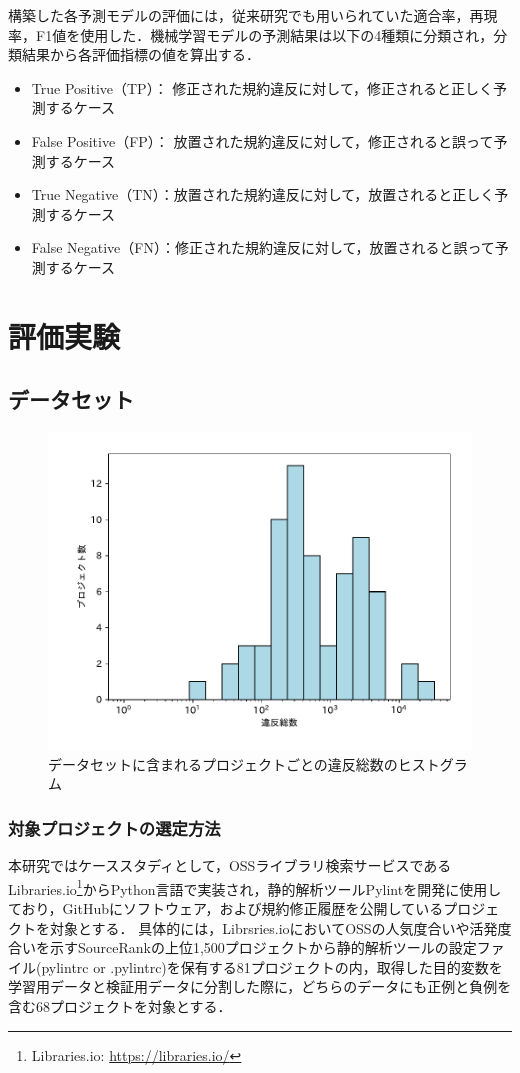\documentclass[submit,noauthor,dvipdfmx]{ipsj}
\begin{document}
構築した各予測モデルの評価には，従来研究でも用いられていた適合率，再現率，F1値を使用した．機械学習モデルの予測結果は以下の4種類に分類され，分類結果から各評価指標の値を算出する．

\begin{itemize}
\item True Positive（TP）： 修正された規約違反に対して，修正されると正しく予測するケース
\item False Positive（FP）： 放置された規約違反に対して，修正されると誤って予測するケース
\item True Negative（TN）：放置された規約違反に対して，放置されると正しく予測するケース
\item False Negative（FN）：修正された規約違反に対して，放置されると誤って予測するケース
\end{itemize}


\section{評価実験}\label{chap:result}

\subsection{データセット}

\begin{figure}[tbp]
	\centering
	\includegraphics[width=0.7\linewidth]{Kameoka_fig/dataset_hist.pdf}
	\caption{データセットに含まれるプロジェクトごとの違反総数のヒストグラム}
	\label{fig:dataset}
\end{figure}

\subsubsection{対象プロジェクトの選定方法}
本研究ではケーススタディとして，OSSライブラリ検索サービスであるLibraries.io\footnote{Libraries.io: \url{https://libraries.io/}}からPython言語で実装され，静的解析ツールPylintを開発に使用しており，GitHubにソフトウェア，および規約修正履歴を公開しているプロジェクトを対象とする．
具体的には，Librsries.ioにおいてOSSの人気度合いや活発度合いを示すSourceRankの上位1,500プロジェクトから静的解析ツールの設定ファイル(pylintrc or .pylintrc)を保有する81プロジェクトの内，取得した目的変数を学習用データと検証用データに分割した際に，どちらのデータにも正例と負例を含む68プロジェクトを対象とする．
\end{document}
